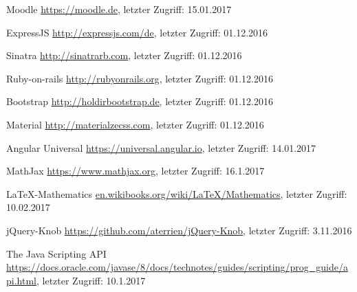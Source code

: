 \begin{thebibliography}{}
Moodle \url{https://moodle.de}, letzter Zugriff: 15.01.2017

ExpressJS \url{http://expressjs.com/de}, letzter Zugriff: 01.12.2016

Sinatra \url{http://sinatrarb.com}, letzter Zugriff: 01.12.2016

Ruby-on-rails \url{http://rubyonrails.org}, letzter Zugriff: 01.12.2016

Bootstrap \url{http://holdirbootstrap.de}, letzter Zugriff: 01.12.2016

Material \url{http://materialzecss.com}, letzter Zugriff: 01.12.2016

Angular Universal \url{https://universal.angular.io}, letzter Zugriff: 14.01.2017

MathJax \url{https://www.mathjax.org}, letzter Zugriff: 16.1.2017

LaTeX-Mathematics \url{en.wikibooks.org/wiki/LaTeX/Mathematics}, letzter Zugriff: 10.02.2017

jQuery-Knob \url{https://github.com/aterrien/jQuery-Knob}, letzter Zugriff: 3.11.2016

The Java Scripting API \url{https://docs.oracle.com/javase/8/docs/technotes/guides/scripting/prog\_guide/api.html}, letzter Zugriff: 10.1.2017


\end{thebibliography}

\clearpage\thispagestyle{empty}
\eigen  %












